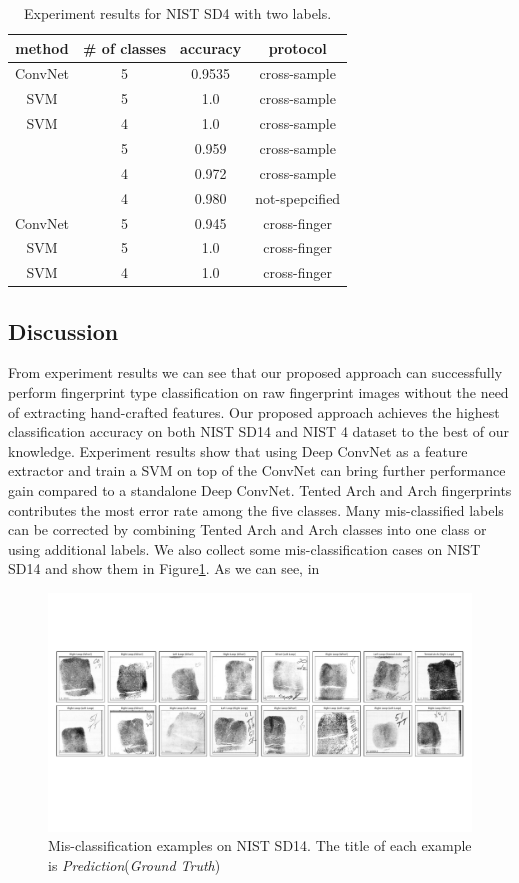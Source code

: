\begin{table}[!ht]
	\centering
	\caption{Experiment results for NIST SD4 with two labels.}
	\label{tab.SD4_result_two_labels}
	\begin{tabular}{|c|c|c|c|}
		\hline
		\textbf{method} & \textbf{\# of classes} & \textbf{accuracy} & \textbf{protocol} \\ \hline
		ConvNet & 5 & 0.9535 & cross-sample \\ \hline
		SVM & 5 & 1.0 & cross-sample \\ \hline
		SVM & 4 & 1.0 & cross-sample \\ \hline
		\cite{cao2013fingerprint} & 5 & 0.959 & cross-sample \\ \hline
		\cite{cao2013fingerprint}& 4 & 0.972 & cross-sample \\ \hline
		\cite{wang2014fingerprint} & 4 & 0.980 & not-spepcified \\ \hline
		ConvNet & 5 & 0.945 & cross-finger \\ \hline
		SVM & 5 & 1.0 & cross-finger \\ \hline
		SVM & 4 & 1.0 & cross-finger \\ \hline
	\end{tabular}
\end{table}


\subsection{Discussion}
%
From experiment results we can see that our proposed approach can successfully perform fingerprint type classification on raw fingerprint images without the need of extracting hand-crafted features.
%
Our proposed approach achieves the highest classification accuracy on both NIST SD14 and NIST 4 dataset to the best of our knowledge. 
%
Experiment results show that using Deep ConvNet as a feature extractor and train a SVM on top of the ConvNet can bring further performance gain compared to a standalone Deep ConvNet.
%
Tented Arch and Arch fingerprints contributes the most error rate among the five classes.
%
Many mis-classified labels can be corrected by combining Tented Arch and Arch classes into one class or using additional labels.
%
We also collect some mis-classification cases on NIST SD14  and show them in Figure\ref{fig.fails}.
%
As we can see, in 

\begin{figure}[!ht]
	\begin{center}
		\includegraphics[scale=0.53,clip=true,trim = 5mm 60mm 5mm 45mm]{fig/figs/fail.pdf}
	\end{center}
	\caption{Mis-classification examples on NIST SD14. The title of each example is \textit{Prediction}(\textit{Ground Truth})} 
	\label{fig.fails}
\end{figure}

